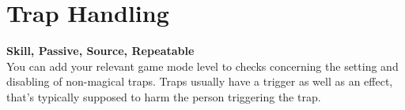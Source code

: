 \section{Trap Handling}\label{sec:trapHandling}
\textbf{Skill, Passive, Source, Repeatable}\\
You can add your relevant game mode level to checks concerning the setting and disabling of non-magical traps.
Traps usually have a trigger as well as an effect, that's typically supposed to harm the person triggering the trap.\\
